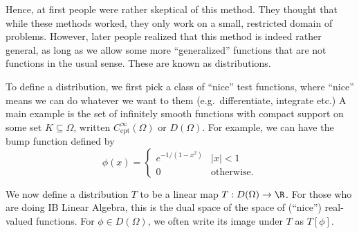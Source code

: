 \documentclass[a4paper]{article}
\begin{document}
Hence, at first people were rather skeptical of this method. They thought that while these methods worked, they only work on a small, restricted domain of problems. However, later people realized that this method is indeed rather general, as long as we allow some more ``generalized'' functions that are not functions in the usual sense. These are known as distributions.

To define a distribution, we first pick a class of ``nice'' test functions, where ``nice'' means we can do whatever we want to them (e.g.\ differentiate, integrate etc.) A main example is the set of infinitely smooth functions with compact support on some set $K\subseteq \Omega$, written $C^{\infty}_{\mathrm{cpt}}(\Omega)$ or $D(\Omega)$. For example, we can have the bump function defined by
\[
  \phi(x) =
  \begin{cases}
    e^{-1/(1- x^2)} & |x| < 1\\
    0 & \text{otherwise}.
  \end{cases}
\]
\begin{center}
\end{center}
We now define a distribution $T$ to be a linear map $T:D(\Omega) \to \R$. For those who are doing IB Linear Algebra, this is the dual space of the space of (``nice'') real-valued functions. For $\phi \in D(\Omega)$, we often write its image under $T$ as $T[\phi]$.
\end{document}
